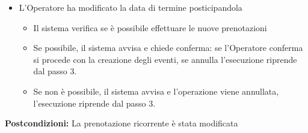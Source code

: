 \documentclass[a4paper,11pt]{article}
\begin{document}
\begin{samepage}
\begin{ucbox}
\begin{itemize}
\begin{itemize}
\end{itemize}
\item[6b.] L'Operatore ha modificato la data di termine posticipandola
\begin{itemize}
\item Il sistema verifica se è possibile effettuare le nuove prenotazioni
\item Se possibile, il sistema avvisa e chiede conferma: se l'Operatore conferma si procede con la creazione degli eventi, se annulla l'esecuzione riprende dal passo 3.
\item Se non è possibile, il sistema avvisa e l'operazione viene annullata, l'esecuzione riprende dal passo 3.
\end{itemize}
\end{itemize}
\noindent\textbf{Postcondizioni:} La prenotazione ricorrente è stata modificata\par
\end{ucbox}
\end{samepage}
\end{document}
